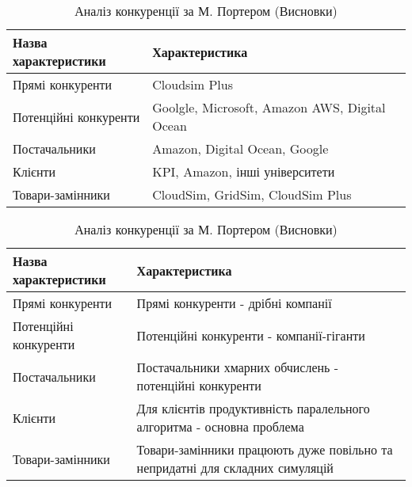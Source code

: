 \begin{table}[H]
	\begin{tabular}
		{|l|p{10cm}|} \hline
		\bf{Назва характеристики} & \bf{Характеристика}
		\\ \hline
		
		Прямі конкуренти & Cloudsim Plus
		\\ \hline
		
		Потенційні конкуренти & Goolgle, Microsoft, Amazon AWS, Digital Ocean
		\\ \hline
		
		Постачальники & Amazon, Digital Ocean, Google
		\\ \hline
		
		Клієнти & KPI, Amazon, інші університети
		\\ \hline
		
		Товари-замінники & CloudSim, GridSim, CloudSim Plus
		\\ \hline
	\end{tabular}
	\caption{Аналіз конкуренції за М. Портером (Складові аналізу)}
	\begin{tabular}
		{|l|p{10cm}|} \hline
		\bf{Назва характеристики} & \bf{Характеристика}
		\\ \hline
		
		Прямі конкуренти & Прямі конкуренти - дрібні компанії
		\\ \hline
		
		Потенційні конкуренти & Потенційні конкуренти - компанії-гіганти
		\\ \hline
		
		Постачальники & Постачальники хмарних обчислень - потенційні конкуренти
		\\ \hline
		
		Клієнти & Для клієнтів продуктивність паралельного алгоритма - основна проблема
		\\ \hline
		
		Товари-замінники & Товари-замінники працюють дуже повільно та непридатні для складних симуляцій
		\\ \hline
	\end{tabular}
	\caption{Аналіз конкуренції за М. Портером (Висновки)}
	
\end{table}

